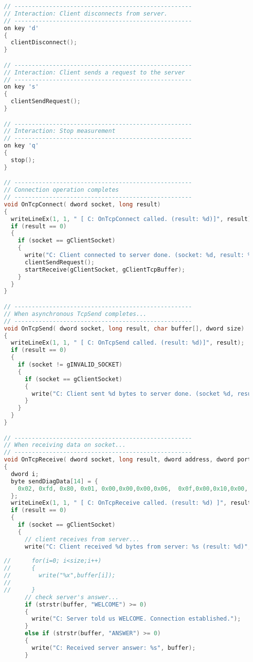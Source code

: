 \begin{lstlisting}[language=C]
// ---------------------------------------------------
// Interaction: Client disconnects from server.
// ---------------------------------------------------
on key 'd'
{
  clientDisconnect();
}

// ---------------------------------------------------
// Interaction: Client sends a request to the server
// ---------------------------------------------------
on key 's'
{
  clientSendRequest();
}

// ---------------------------------------------------
// Interaction: Stop measurement
// ---------------------------------------------------
on key 'q'
{
  stop();
}

// ---------------------------------------------------
// Connection operation completes
// ---------------------------------------------------
void OnTcpConnect( dword socket, long result)
{
  writeLineEx(1, 1, " [ C: OnTcpConnect called. (result: %d)]", result);
  if (result == 0)
  {
    if (socket == gClientSocket)
    {
      write("C: Client connected to server done. (socket: %d, result: %d)", socket, result);
      clientSendRequest();
      startReceive(gClientSocket, gClientTcpBuffer);
    }
  }
}

// ---------------------------------------------------
// When asynchronous TcpSend completes...
// ---------------------------------------------------
void OnTcpSend( dword socket, long result, char buffer[], dword size)
{
  writeLineEx(1, 1, " [ C: OnTcpSend called. (result: %d)]", result);
  if (result == 0)
  {
    if (socket != gINVALID_SOCKET)
    {
      if (socket == gClientSocket)
      {
        write("C: Client sent %d bytes to server done. (socket %d, result: %d)", size, socket, result);
      }
    }
  }
}

// ---------------------------------------------------
// When receiving data on socket...
// ---------------------------------------------------
void OnTcpReceive( dword socket, long result, dword address, dword port, char buffer[], dword size)
{
  dword i;
  byte sendDiagData[14] = {
    0x02, 0xfd, 0x80, 0x01, 0x00,0x00,0x00,0x06,  0x0f,0x00,0x10,0x00, 0x10, 0x03
  };
  writeLineEx(1, 1, " [ C: OnTcpReceive called. (result: %d) ]", result);
  if (result == 0)
  {
    if (socket == gClientSocket)
    {
      // client receives from server...
      write("C: Client received %d bytes from server: %s (result: %d)", size, buffer, result);
      
//      for(i=0; i<size;i++)
//      {
//        write("%x",buffer[i]);
//        
//      }
      // check server's answer...
      if (strstr(buffer, "WELCOME") >= 0)
      {
        write("C: Server told us WELCOME. Connection established.");
      }
      else if (strstr(buffer, "ANSWER") >= 0)
      {
        write("C: Received server answer: %s", buffer);
      }
      

\end{lstlisting}
